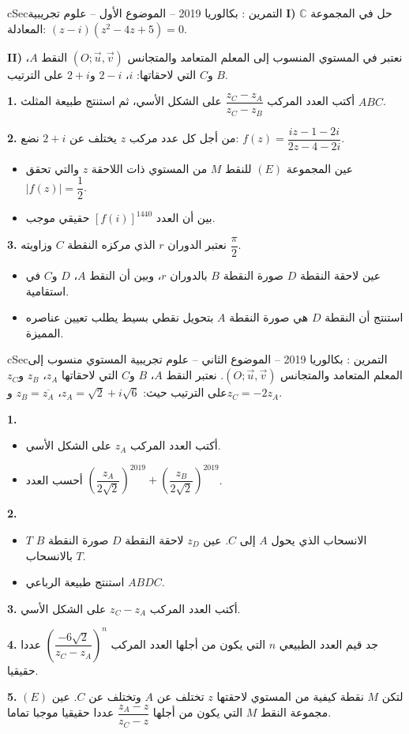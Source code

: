 \documentclass[12pt,a4paper]{article}
\newenvironment{BOX}[2]{\begin{otherlanguage}{english}\begin{arbox}{#1}{#2}}{\end{arbox}\end{otherlanguage}}
\newcounter{exo}
\newenvironment{tamrin}[1]{\stepcounter{exo}\begin{BOX}{cSec}{التمرين \theexo: #1}}{\end{BOX}}
\newenvironment{sq}{\begin{itemize}[leftmargin=2.4em,itemsep=3pt]}{\end{itemize}}
\newcommand{\qa}{\item[(أ)]}\newcommand{\qb}{\item[(ب)]}\newcommand{\qc}{\item[(جـ)]}\newcommand{\qd}{\item[(د)]}\newcommand{\qe}{\item[(هـ)]}
\newcommand{\QQ}[1]{\par\smallskip\textbf{#1.} }
\begin{document}
\begin{tamrin}{بكالوريا 2019 -- الموضوع الأول -- علوم تجريبية}
\textbf{I)} حل في المجموعة $\mathbb{C}$ المعادلة: $(z-i)\left(z^2-4z+5\right)=0$.

\textbf{II)} نعتبر في المستوي المنسوب إلى المعلم المتعامد والمتجانس $(O;\vec u,\vec v)$ النقط $A$، $B$ و$C$ التي لاحقاتها: $i$، $2-i$ و$2+i$ على الترتيب.
\QQ{1} أكتب العدد المركب $\dfrac{z_C-z_A}{z_C-z_B}$ على الشكل الأسي، ثم استنتج طبيعة المثلث $ABC$.
\QQ{2} من أجل كل عدد مركب $z$ يختلف عن $2+i$ نضع: $f(z)=\dfrac{iz-1-2i}{2z-4-2i}$.
\begin{sq}
\qa عين المجموعة $(E)$ للنقط $M$ من المستوي ذات اللاحقة $z$ والتي تحقق $|f(z)|=\dfrac12$.
\qb بين أن العدد $\left[f(i)\right]^{1440}$ حقيقي موجب.
\end{sq}
\QQ{3} نعتبر الدوران $r$ الذي مركزه النقطة $C$ وزاويته $\dfrac{\pi}{2}$.
\begin{sq}
\qa عين لاحقة النقطة $D$ صورة النقطة $B$ بالدوران $r$، وبين أن النقط $A$، $D$ و$C$ في استقامية.
\qb استنتج أن النقطة $D$ هي صورة النقطة $A$ بتحويل نقطي بسيط يطلب تعيين عناصره المميزة.
\end{sq}
\end{tamrin}

\begin{tamrin}{بكالوريا 2019 -- الموضوع الثاني -- علوم تجريبية}
المستوي منسوب إلى المعلم المتعامد والمتجانس $(O;\vec u,\vec v)$.
نعتبر النقط $A$، $B$ و$C$ التي لاحقاتها $z_A$، $z_B$ و$z_C$ على الترتيب حيث: $z_A=\sqrt2+i\sqrt6$، $z_B=\overline{z_A}$ و$z_C=-2z_A$.
\QQ{1}
\begin{sq}
\qa أكتب العدد المركب $z_A$ على الشكل الأسي.
\qb أحسب العدد $\left(\dfrac{z_A}{2\sqrt2}\right)^{2019}+\left(\dfrac{z_B}{2\sqrt2}\right)^{2019}$.
\end{sq}
\QQ{2}
\begin{sq}
\qa $T$ الانسحاب الذي يحول $A$ إلى $C$. عين $z_D$ لاحقة النقطة $D$ صورة النقطة $B$ بالانسحاب $T$.
\qb استنتج طبيعة الرباعي $ABDC$.
\end{sq}
\QQ{3} أكتب العدد المركب $z_C-z_A$ على الشكل الأسي.
\QQ{4} جد قيم العدد الطبيعي $n$ التي يكون من أجلها العدد المركب $\left(\dfrac{-6\sqrt2}{z_C-z_A}\right)^n$ عددا حقيقيا.
\QQ{5} لتكن $M$ نقطة كيفية من المستوي لاحقتها $z$ تختلف عن $A$ وتختلف عن $C$.
عين $(E)$ مجموعة النقط $M$ التي يكون من أجلها $\dfrac{z_A-z}{z_C-z}$ عددا حقيقيا موجبا تماما.
\end{tamrin}
\end{document}
